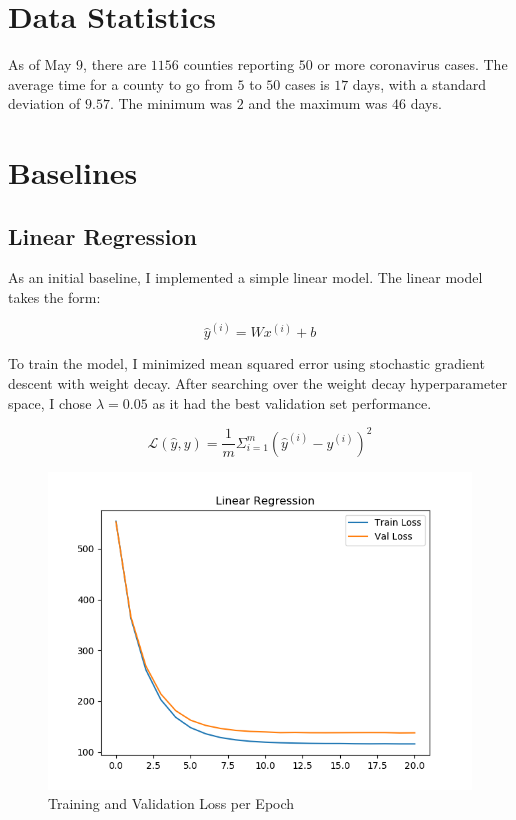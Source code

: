 \documentclass[12pt]{article}
\begin{document}
\section{Data Statistics}

    As of May 9, there are $1156$ counties reporting $50$ or more coronavirus cases. The average time for a county to go from $5$ to $50$ cases is $17$ days, with a standard deviation of $9.57$. The minimum was $2$ and the maximum was $46$ days.


\section{Baselines}

    \subsection{Linear Regression}

    As an initial baseline, I implemented a simple linear model. The linear model takes the form:

\begin{equation} \hat y^{(i)} = W x^{(i)} + b \end{equation}

To train the model, I minimized mean squared error using stochastic gradient descent with weight decay. After searching over the weight decay hyperparameter space, I chose $\lambda = 0.05$ as it had the best validation set performance.

\begin{equation} \mathcal{L}(\hat y, y) = \frac{1}{m}\Sigma_{i=1}^m (\hat y^{(i)} - y^{(i)})^2 \end{equation}

    \begin{figure}[h!]
    \begin{center}
    \includegraphics[scale = 0.5]{"../../output/linear/train_val_loss"}
        \caption{Training and Validation Loss per Epoch}
    \end{center}
    \end{figure}
\end{document}

